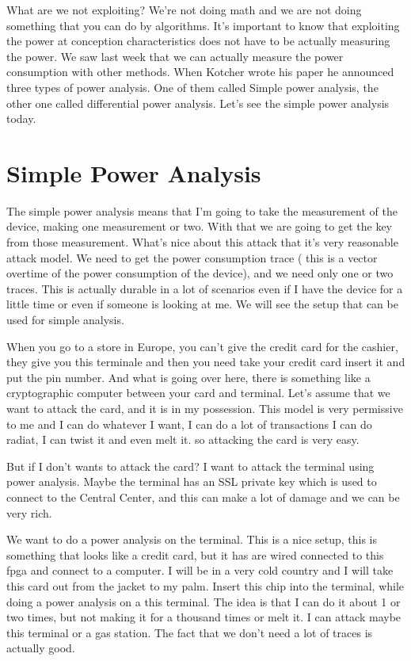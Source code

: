 What are we not exploiting? We're not doing math and we are not doing something
that you can do by algorithms. It's important to know that exploiting the power
at conception characteristics does not have to be actually measuring the power.
We saw last week that we can actually measure the power consumption with other
methods. When Kotcher wrote his paper he announced three types of power
analysis. One of them called Simple power analysis, the other one called
differential power analysis. Let's see the simple power analysis today.

\section{Simple Power Analysis}

The simple power analysis means that I'm going to take the measurement of the
device, making one measurement or two. With that we are going to get the key
from those measurement. What's nice about this attack that it's very reasonable
attack model. We need to get the power consumption trace ( this is a vector
overtime of the power consumption of the device), and we need only one or two
traces. This is actually durable in a lot of scenarios even if I have the device
for a little time or even if someone is looking at me. We will see the setup
that can be used for simple analysis. 

When you go to a store in Europe, you can't give the credit card for the
cashier, they give you this terminale and then you need take your credit card
insert it and put the pin number. And what is going over here, there is
something like a cryptographic computer between your card and terminal. Let's
assume that we want to attack the card, and it is in my possession. This model
is very permissive to me and I can do whatever I want, I can do a lot of
transactions I can do radiat, I can twist it and even melt it. so attacking the
card is very easy.


But if I don't wants to attack the card? I want to attack the terminal using
power analysis. Maybe the terminal has an SSL private key which is used to
connect to the Central Center, and this can make a lot of damage and we can be
very rich.

We want to do a power analysis on the terminal. This is a nice setup, this is
something that looks like a credit card, but it has are wired connected to this
fpga and connect to a computer. I will be in a very cold country and I will take
this card out from the jacket to my palm. Insert this chip into the terminal,
while doing a power analysis on a this terminal. The idea is that I can do it
about 1 or two times, but not making it for a thousand times or melt it. I can
attack maybe this terminal or a gas station. The fact that we don't need a lot
of traces is actually good.

